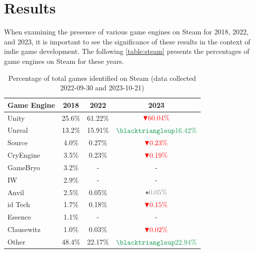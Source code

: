 \section{Results}
When examining the presence of various game engines on Steam for 2018, 2022, and 2023, it is important to see the significance of these results in the context of indie game development.
The following \autoref{table:steam} presents the percentages of game engines on Steam for these years.

\begin{table}[ht!]
    \centering
    \begin{tabular}{|l c c c|}
        \hline
        Game Engine & 2018   & 2022    & 2023    \\
        \hline\hline
        Unity       & 25.6\% & 61.22\% & $\textcolor{red}{\blacktriangledown 60.04\%}$  \\
        Unreal      & 13.2\% & 15.91\% & $\textcolor{ForestGreen}{\blacktriangleup 16.42\%}$  \\
        Source      & 4.0\%  & 0.27\%  & $\textcolor{red}{\blacktriangledown 0.23\%}$   \\
        CryEngine   & 3.5\%  & 0.23\%  & $\textcolor{red}{\blacktriangledown 0.19\%}$   \\
        GameBryo    & 3.2\%  & -       & -       \\
        IW          & 2.9\%  & -       & -       \\
        Anvil       & 2.5\%  & 0.05\%  & $\textcolor{gray}{\bullet 0.05\%}$   \\
        id Tech     & 1.7\%  & 0.18\%  & $\textcolor{red}{\blacktriangledown 0.15\%}$   \\
        Essence     & 1.1\%  & -       & -       \\
        Clausewitz  & 1.0\%  & 0.03\%  & $\textcolor{red}{\blacktriangledown 0.02\% }$  \\
        Other       & 48.4\% & 22.17\% & $\textcolor{ForestGreen}{\blacktriangleup 22.94\%}$  \\
        \hline
    \end{tabular}
    \caption{Percentage of total games identified on Steam (data collected 2022-09-30 and 2023-10-21)}
    \label{table:steam}
\end{table}

